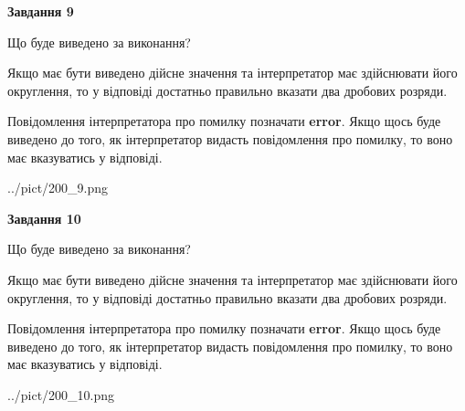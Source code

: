 \documentclass[12pt, ukrainian]{article}
\begin{document}
{\begin {Large}
{\begin {center}\textbf{Завдання 9}\end {center}}\par
Що буде виведено за виконання? \par

Якщо має бути виведено дійсне значення та інтерпретатор має здійснювати його округлення, 
то у відповіді достатньо правильно вказати два дробових розряди.

Повідомлення інтерпретатора про помилку позначати \textbf{error}.
Якщо щось буде виведено до того, як інтерпретатор видасть повідомлення про помилку, 
то воно має вказуватись у відповіді. \par

\begin{center}
	{../pict/200_9.png}
\end{center}
\newpage

{\begin {center}\textbf{Завдання 10}\end {center}}\par
Що буде виведено за виконання? \par

Якщо має бути виведено дійсне значення та інтерпретатор має здійснювати його округлення, 
то у відповіді достатньо правильно вказати два дробових розряди.

Повідомлення інтерпретатора про помилку позначати \textbf{error}.
Якщо щось буде виведено до того, як інтерпретатор видасть повідомлення про помилку, 
то воно має вказуватись у відповіді. \par

\begin{center}
	{../pict/200_10.png}
\end{center}
\newpage

\end {Large}}
\end{document}
